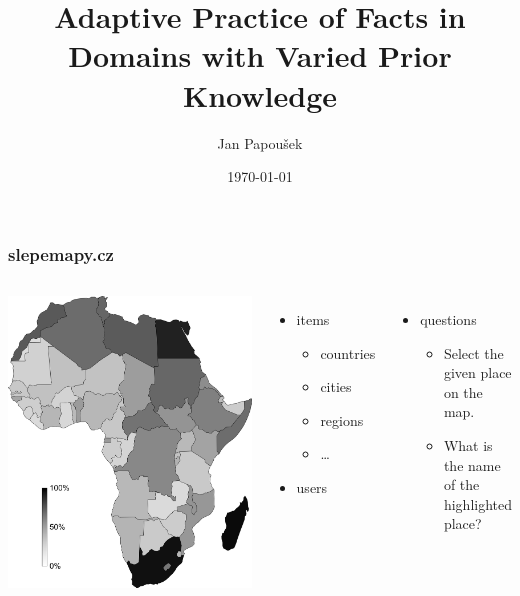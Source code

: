 \documentclass[xcolor=svgnames]{beamer}
\title[Adaptive Practice]{Adaptive Practice of Facts in Domains with Varied Prior Knowledge}
\author{Jan Papoušek}
\institute{Masaryk University Brno}
\date{\today}
\begin{document}
\frame[plain]{\titlepage}
\begin{frame}
	\frametitle{slepemapy.cz}
	\begin{columns}
			\includegraphics[width=\textwidth]{2014-IA068-adaptive-practice/africa-with-scale.png}
			\begin{itemize}
				\item items
					\begin{itemize}
						\item countries
						\item cities
						\item regions
						\item \ldots
					\end{itemize}
				\item users
			\end{itemize}

			\bigskip

			\begin{itemize}
				\item questions
					\begin{itemize}
						\item Select the given place on the map.
						\item What is the name of the highlighted place?
					\end{itemize}
			\end{itemize}
	\end{columns}
\end{frame}
\end{document}
